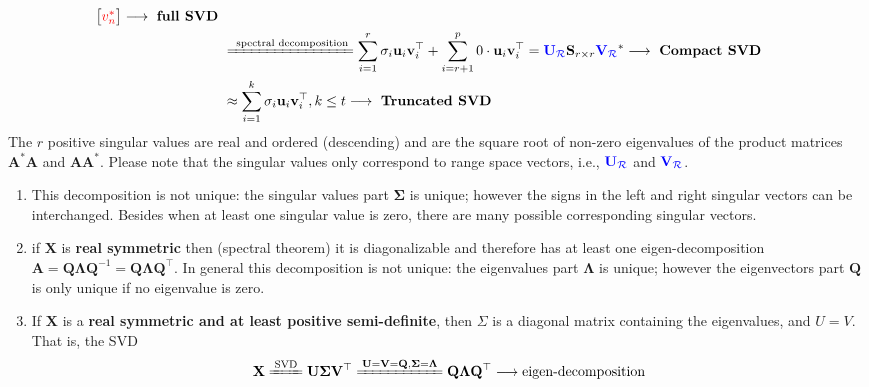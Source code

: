 \documentclass[14pt]{article}
\theoremstyle{definition}
\theoremstyle{remark}
\newenvironment{remark}
  {\pushQED{\qed}\renewcommand{\qedsymbol}{$\triangle$}\remarkx}
  {\popQED\endremarkx}
\begin{document}
\begin{align*}
\begin{bmatrix}
        \color{red}{v_{n}^{*}}
    \end{bmatrix} \longrightarrow \text{ \textbf{full SVD} }                                                                                               \\
     & \xlongequal{\text{ spectral decomposition}}\sum_{i=1}^{r} \sigma_{i} \mathbf{u}_{i} \mathbf{v}_{i}^\top
    + \sum_{i=r+1}^{p} 0\cdot \mathbf{u}_{i} \mathbf{v}_{i}^\top
    = {\color{blue}\mathbf{U}_{\mathcal{R}}}\mathbf{S}_{r\times r}{\color{blue}\mathbf{V}_{\mathcal{R}}}^{*} \longrightarrow \text{ \textbf{Compact SVD} } \\
     & \approx \sum_{i=1}^{k} \sigma_{i} \mathbf{u}_{i} \mathbf{v}_{i}^\top, k\le t \longrightarrow \text{ \textbf{Truncated SVD} }
\end{align*}
The $r$ positive singular values are real and ordered (descending) and are the square root of non-zero
eigenvalues of the product matrices $\mathbf{A}^* \mathbf{A}$ and $\mathbf{A} \mathbf{A}^*$. Please note that the singular values only correspond to range space vectors, i.e., $\color{blue}{\mathbf{U}_{\mathcal{R}}}$ and $\color{blue}{\mathbf{V}_{\mathcal{R}}}$.

\begin{remark}\hfill
    \begin{enumerate}
        \item This decomposition is not unique:
              the singular values part $\mathbf{\Sigma}$ is unique;
              however the signs in the left and right singular vectors can be interchanged.
              Besides when at least one singular value is zero, there are many possible
              corresponding singular vectors.
        \item if $\mathbf{X}$ is \textbf{real symmetric} then (spectral theorem) it is diagonalizable and therefore
              has at least one eigen-decomposition $\mathbf{A}=\mathbf{Q}\mathbf{\Lambda}\mathbf{Q}^{-1} = \mathbf{Q}\mathbf{\Lambda}\mathbf{Q}^\top$.
              In general this decomposition is not unique: the eigenvalues part $\mathbf{\Lambda}$ is unique;
              however the eigenvectors part $\mathbf{Q}$ is only unique if no eigenvalue is zero.
        \item If $\mathbf{X}$ is a \textbf{real symmetric and at least positive semi-definite}, then 
        $\Sigma$ is a diagonal matrix containing the eigenvalues, and $U=V$. 
        That is, the SVD 
        $$
        \mathbf{X} \xlongequal{\text{SVD}} \mathbf{U}\mathbf{\Sigma}\mathbf{V}^\top 
        \xlongequal{\mathbf{U}=\mathbf{V}=\mathbf{Q},\mathbf{\Sigma}=\mathbf{\Lambda}} 
        \mathbf{Q}\mathbf{\Lambda}\mathbf{Q}^\top
        \longrightarrow \text{eigen-decomposition}$$ 
    \end{enumerate}
\end{remark}
\end{document}
